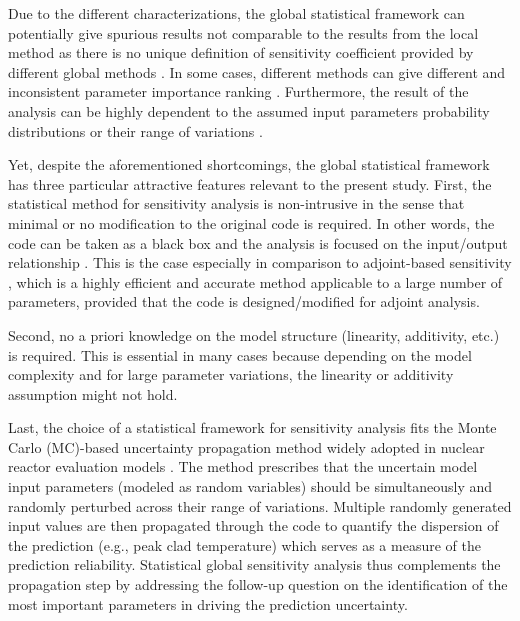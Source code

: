 Due to the different characterizations, the global statistical framework can potentially give spurious results not comparable to the results from the local method as there is no unique definition of sensitivity coefficient provided by different global methods \cite{Razavi2015}. 
In some cases, different methods can give different and inconsistent parameter importance ranking \cite{Saltelli2008,Saltelli2004}.
Furthermore, the result of the analysis can be highly dependent to the assumed input parameters probability distributions or their range of variations \cite{Cacuci2004,Cacuci2010}.

Yet, despite the aforementioned shortcomings, 
the global statistical framework has three particular attractive features relevant to the present study. 
First, the statistical method for sensitivity analysis is non-intrusive in the sense that minimal or no modification to the original code is required. 
In other words, the code can be taken as a black box and the analysis is focused on the input/output relationship \cite{Saltelli2008}. 
This is the case especially in comparison to adjoint-based sensitivity \cite{Cacuci2000,Ionescu-Bujor2000}, which is a highly efficient and accurate method applicable to a large number of parameters, 
provided that the code is designed/modified for adjoint analysis.

Second, no a priori knowledge on the model structure (linearity, additivity, etc.) is required. 
This is essential in many cases because depending on the model complexity and for large parameter variations, the linearity or additivity assumption might not hold.

Last, 
the choice of a statistical framework for sensitivity analysis fits the Monte Carlo (MC)-based uncertainty propagation method widely adopted in nuclear reactor evaluation models \cite{Boyack1990, Nutt2004, Wallis2007, Glaeser2008}. 
The method prescribes that the uncertain model input parameters (modeled as random variables) 
should be simultaneously and randomly perturbed across their range of variations. 
Multiple randomly generated input values are then propagated through the code to quantify the dispersion of the prediction (e.g., peak clad temperature) 
which serves as a measure of the prediction reliability. 
Statistical global sensitivity analysis thus complements the propagation step 
by addressing the follow-up question on the identification of the most important parameters in driving the prediction uncertainty. 

